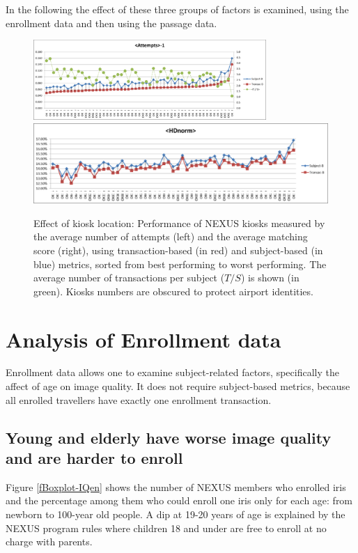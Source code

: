 \documentclass{cta-author}%
\begin{document}
 In the following the effect of these three groups of factors is examined, using the enrollment data and then using the passage data.


\begin{figure}[!b]
\centering
\includegraphics[width=0.50\linewidth,height=1.2in]{eps/image060-hidden.eps}~
\includegraphics[width=0.49\linewidth,height=1.2in]{eps/image061-hidden.eps} 

\caption{Effect of kiosk location: Performance of NEXUS kiosks measured by the average number of attempts (left) and the average matching score (right), using transaction-based (in red) and subject-based (in blue) metrics, sorted from best performing to worst performing. 
The average number of transactions per subject ($T/S$) is shown (in green).
Kiosks numbers are obscured  to protect airport identities.
}
\label{fKIOSKS}
\end{figure}




\section{Analysis of Enrollment data}
\label{s.resultsEN}

Enrollment data allows one to examine subject-related factors, specifically the affect of age on image quality.
It does not require subject-based metrics, because all enrolled travellers have exactly one enrollment transaction.




\subsection{Young and elderly have worse image quality and are harder to enroll}
\label{s.IQ-EN-age}

Figure \ref{fBoxplot-IQen} %
shows the number of NEXUS members who enrolled iris and the percentage among them who could enroll one iris only for each age:
from newborn to 100-year old people.
A dip at  19-20 years of age is explained by the NEXUS program rules where children 18 and under are free to enroll at no charge with parents. 
\end{document}
